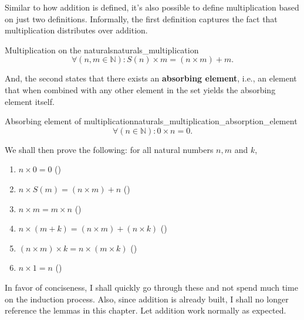 Similar to how addition is defined, it's also possible to define multiplication based on just two
definitions. Informally, the first definition captures the fact that multiplication distributes over
addition.
\begin{df}{Multiplication on the naturals}{naturals_multiplication}
  \begin{equation*}
    \forall (n, m \in \mathbb{N}) : S(n) \times m = (n \times m) + m.
  \end{equation*}
\end{df}
And, the second states that there exists an \textbf{absorbing element}, i.e., an element that when
combined with any other element in the set yields the absorbing element itself.
\begin{df}{Absorbing element of multiplication}{naturals_multiplication_absorption_element}
  \begin{equation*}
    \forall (n \in \mathbb{N}) : 0 \times n = 0.
  \end{equation*}
\end{df}
We shall then prove the following: for all natural numbers \(n, m\) and \(k\),
\begin{enumerate}[noitemsep]
  \item \(n \times 0 = 0\) ()
  \item \(n \times S(m) = (n \times m) + n\) ()
  \item \(n \times m = m \times n\) ()
  \item \(n \times (m + k) = (n \times m) + (n \times k)\)
        ()
  \item \((n \times m) \times k = n \times (m \times k)\)
        ()
  \item \(n \times 1 = n\) ()
\end{enumerate}
In favor of conciseness, I shall quickly go through these and not spend much time on the induction
process. Also, since addition is already built, I shall no longer reference the lemmas in this
chapter. Let addition work normally as expected.

